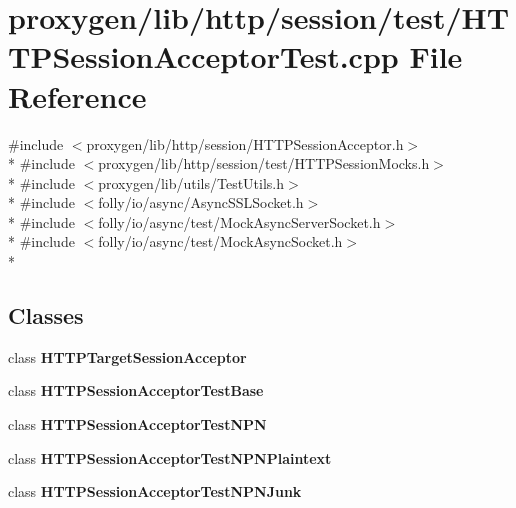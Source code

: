 \section{proxygen/lib/http/session/test/\+H\+T\+T\+P\+Session\+Acceptor\+Test.cpp File Reference}
\label{HTTPSessionAcceptorTest_8cpp}
{\ttfamily \#include $<$proxygen/lib/http/session/\+H\+T\+T\+P\+Session\+Acceptor.\+h$>$}\\*
{\ttfamily \#include $<$proxygen/lib/http/session/test/\+H\+T\+T\+P\+Session\+Mocks.\+h$>$}\\*
{\ttfamily \#include $<$proxygen/lib/utils/\+Test\+Utils.\+h$>$}\\*
{\ttfamily \#include $<$folly/io/async/\+Async\+S\+S\+L\+Socket.\+h$>$}\\*
{\ttfamily \#include $<$folly/io/async/test/\+Mock\+Async\+Server\+Socket.\+h$>$}\\*
{\ttfamily \#include $<$folly/io/async/test/\+Mock\+Async\+Socket.\+h$>$}\\*
\subsection*{Classes}
\begin{DoxyCompactItemize}
\item 
class {\bf H\+T\+T\+P\+Target\+Session\+Acceptor}
\item 
class {\bf H\+T\+T\+P\+Session\+Acceptor\+Test\+Base}
\item 
class {\bf H\+T\+T\+P\+Session\+Acceptor\+Test\+N\+PN}
\item 
class {\bf H\+T\+T\+P\+Session\+Acceptor\+Test\+N\+P\+N\+Plaintext}
\item 
class {\bf H\+T\+T\+P\+Session\+Acceptor\+Test\+N\+P\+N\+Junk}
\end{DoxyCompactItemize}
